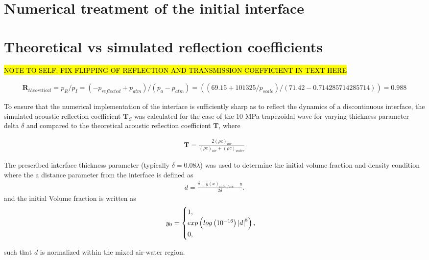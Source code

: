 \section*{Numerical treatment of the initial interface}


\section*{Theoretical vs simulated reflection coefficients}


\hl{NOTE TO SELF: FIX FLIPPING OF REFLECTION AND TRANSMISSION COEFFICIENT IN TEXT HERE}

\begin{align*}
  \boldsymbol{R}_{theoretical}=p_R/p_I=(-p_{reflected}+p_{atm})/(p_a-p_{atm})=((69.15+101325/p_{scale})/(71.42-0.714285714285714))=0.988
\end{align*}

To ensure that the numerical implementation of the interface is sufficiently sharp as to reflect the dynamics of a discontinuous interface, the simulated acoustic reflection coefficient $\boldsymbol{T}_S$ was calculated for the case of the $10$ MPa trapezoidal wave for varying thickness parameter delta $\delta$ and compared to the theoretical acoustic reflection coefficient $\boldsymbol{T}$, where 

\begin{align*}
  \boldsymbol{T}=\frac{2\left(\rho c\right)_{air}}{\left(\rho c\right)_{air}+\left(\rho c\right)_{water}}
\end{align*}


The prescribed interface thickness parameter (typically $\delta = 0.08\lambda$) was used to determine the initial volume fraction and density condition where the a distance parameter from the interface is defined as 
\begin{align*}
  d = \frac{\delta +y(x)_{interface} -y}{2\delta}.
\end{align*}
and the initial Volume fraction is written as 
\begin{align*}
  y_0 = %
  \begin{cases}
    1,\\%
    exp\left(log\left(10^{-16}\right)\abs{d}^8\right),\\%
    0,%
  \end{cases}%
\end{align*}

such that $d$ is normalized within the mixed air-water region.

